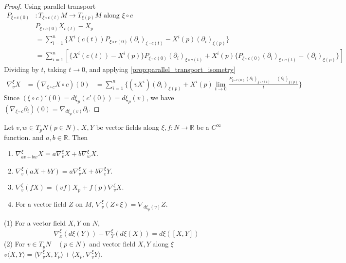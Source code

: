 \begin{proof}
    Using parallel transport
    \[
    \begin{aligned}
        P_{\xi \circ c(0)}& : T_{\xi \circ c(t)}M \to T_{\xi(p)}M \text{ along } \xi \circ c \\
        & P_{\xi \circ c(0)} X_{c(t)} -X_p\\
        &= \sum_{i=1}^n \{X^i (c(t)) P_{\xi \circ c(0) }(\partial_i)_{\xi \circ c(t)} - X^i(p) (\partial_i)_{\xi(p)}\} \\
        &= \sum_{i=1}^n [\{X^i(c(t)) - X^i(p)\}P_{\xi \circ c(0)}(\partial_i)_{\xi \circ c(t)} + X^i(p)\{P_{\xi \circ c(0)}(\partial_i)_{\xi \circ c(t)} - (\partial_i)_{\xi(p)}\}]
    \end{aligned}
    \]
    Dividing by $t$, taking $t \to 0$, and applying \autoref{prop:parallel_transport_isometry}
    \[
    \begin{aligned}
        \nabla_v^{\xi}X &= (\nabla_{\xi \circ c} X \circ c)( 0) &= \sum_{i=1}^n \{(v X^i)(\partial_i)_{\xi(p)} + X^i(p) \lim_{t \to 0} \frac{P_{\xi \circ c(0)}(\partial_i)_{\xi \circ c(t)} - (\partial_i)_{\xi(p)}}{t}\} 
    \end{aligned}
    \]
    Since $(\xi \circ c)'(0) = d \xi_p(c'(0)) = d \xi_p(v)$, we have $(\nabla_{\xi \circ c} \partial_i)(0) = \nabla_{d \xi_p(v)} \partial_i$.
\end{proof}

\begin{proposition}\label{prop:6.16}
    Let $v,w \in T_p N (p \in N)$, $X,Y$ be vector fields along $\xi, f:N \to \mathbb{R}$ be a $C^{\infty}$ function. 
    and $a,b \in \mathbb{R}$. Then
    \begin{enumerate}[label=(\roman*), ref=Proposition \theproposition~(\roman*)]
        \item \label{prop:6.16.1} $\nabla_{av + bw}^{\xi}X = a \nabla_v^{\xi}X + b \nabla_w^{\xi}X$.
        \item \label{prop:6.16.2} $\nabla_v^{\xi}(aX + bY) = a \nabla_v^{\xi}X + b \nabla_v^{\xi}Y$.
        \item \label{prop:6.16.3} $\nabla_v^{\xi}(fX) = (vf) X_p + f(p) \nabla_v^{\xi}X$.
        \item \label{prop:6.16.4} For a vector field $Z$ on $M$, $\nabla_v^{\xi}(Z \circ \xi) = \nabla_{d \xi_p(v)} Z$.
    \end{enumerate}
\end{proposition}

\begin{proposition}
    (1) For a vector field $X,Y$ on $N$,
    \[
    \begin{aligned}
        \nabla_x^{\xi} (d \xi (Y)) - \nabla_Y^{\xi}(d \xi (X)) = d \xi([X,Y])
    \end{aligned}
    \]
    (2) For $v \in T_p N \quad (p \in N)$ and vector field $X,Y$ along $\xi$ 
    $v \langle X, Y \rangle = \langle \nabla_v^{\xi}X, Y_p \rangle + \langle X_p, \nabla_v^{\xi}Y \rangle$. 
\end{proposition}

